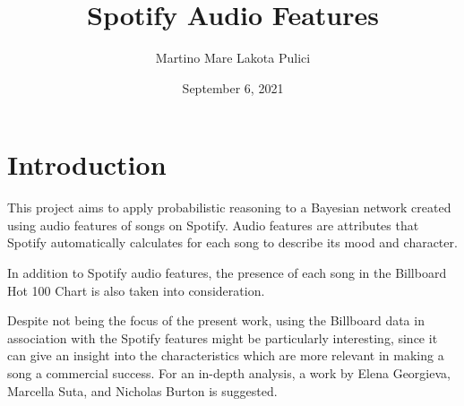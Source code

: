 \documentclass[a4paper, 12pt]{article}
\begin{document}
\title{Spotify Audio Features}
\author{Martino Mare Lakota Pulici}
\date{September 6, 2021}
\maketitle
\begin{center}
\end{center}


\clearpage


\tableofcontents


\clearpage


\listoffigures


\clearpage


\section{Introduction}

This project aims to apply probabilistic reasoning to a Bayesian network created using audio features of songs on Spotify. Audio features are attributes that Spotify automatically calculates for each song to describe its mood and character.

In addition to Spotify audio features, the presence of each song in the Billboard Hot 100 Chart \cite{hot-100} is also taken into consideration.

Despite not being the focus of the present work, using the Billboard data in association with the Spotify features might be particularly interesting, since it can give an insight into the characteristics which are more relevant in making a song a commercial success. For an in-depth analysis, a work by Elena Georgieva, Marcella Suta, and Nicholas Burton \cite{hitpredict-presentation, hitpredict-report} is suggested.
\end{document}
